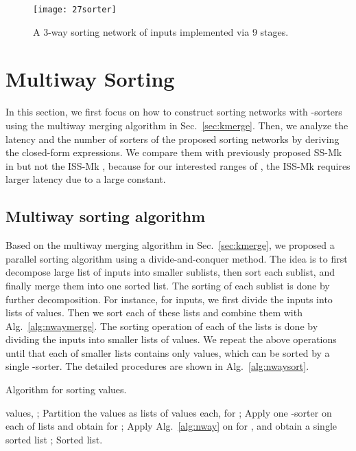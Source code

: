 \documentclass[10pt,journal,cspaper,compsoc]{IEEEtran}
\begin{document}
\begin{figure}[!t]
\centering
\texttt{[image: 27sorter]}
\caption{A 3-way sorting network of  inputs implemented via 9 stages.}
\label{fig:27sorter}
\end{figure}

\section{Multiway Sorting}
\label{sec:ksort}
In this section, we first focus on how to construct sorting networks with -sorters using the multiway merging algorithm in Sec.~\ref{sec:kmerge}. Then, we analyze the latency and the number of sorters of the proposed sorting networks by deriving the closed-form expressions. We compare them with previously proposed SS-Mk in \cite{gao1997sloping} but not the ISS-Mk \cite{zhao1998efficient}, because for our interested ranges of , the ISS-Mk requires larger latency due to a large constant.
\subsection{Multiway sorting algorithm}
Based on the multiway merging algorithm in Sec.~\ref{sec:kmerge}, we proposed a parallel sorting algorithm using a divide-and-conquer method. The idea is to first decompose large list of inputs into smaller sublists, then sort each sublist, and finally merge them into one sorted list. The sorting of each sublist is done by further decomposition.
For instance, for  inputs, we first divide the  inputs into  lists of  values. Then we sort each of these  lists and combine them with Alg.~\ref{alg:nwaymerge}. The sorting operation of each of the  lists is done by dividing the  inputs into  smaller lists of  values. We repeat the above operations until that each of  smaller lists contains only  values, which can be sorted by a single -sorter.
The detailed procedures are shown in Alg.~\ref{alg:nwaysort}.

\begin{algorithm}[!h]
  \caption{Algorithm for sorting  values.}
  \begin{algorithmic}
    \REQUIRE  values, ;
\STATE Partition the  values as  lists of  values each,  for ;
    \STATE Apply one -sorter on each of  lists and obtain  for ;
            \STATE Apply Alg.~\ref{alg:nway} on   for , and obtain a single sorted list ;
        \ENDFOR
    \ENDFOR
    \RETURN Sorted list.
  \end{algorithmic}
  \label{alg:nwaysort}
\end{algorithm}
\end{document}
